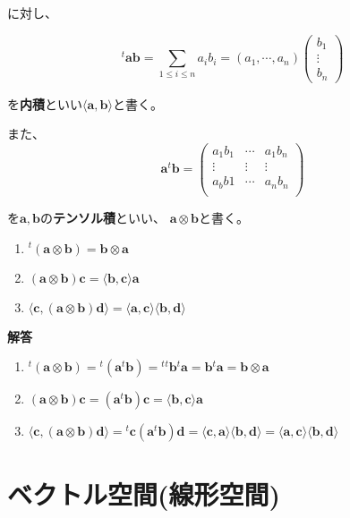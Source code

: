 \documentclass[dvipdfmx,autodetect-engine]{jsarticle}
\newcommand{\innerProduct}[2]{\langle \bm{#1}, \bm{#2} \rangle}
\newcommand{\tensorProduct}[2]{\bm{#1} \otimes \bm{#2}}
\begin{document}
に対し、


$$
{}^t\!\bm{a}\bm{b} = \sum_{1 \leq i \leq n} a_ib_i = (a_1, \cdots, a_n)\begin{pmatrix}
b_1 \\
\vdots \\
b_n
\end{pmatrix}
$$

を{\bf 内積}といい$\langle \bm{a}, \bm{b} \rangle$と書く。

また、
$$
\bm{a}{}^t\!\bm{b} = \begin{pmatrix}
a_1b_1 & \cdots & a_1b_n \\
\vdots & \vdots & \vdots \\
a_bb1 & \cdots & a_nb_n \\
\end{pmatrix}
$$

を$\bm{a}, \bm{b}$の{\bf テンソル積}といい、 $\bm{a} \otimes \bm{b}$と書く。


\begin{enumerate}
\renewcommand{\labelenumi}{(\arabic{enumi})}
\item ${}^t(\tensorProduct{a}{b}) = \tensorProduct{b}{a}$
\item $(\tensorProduct{a}{b})\bm{c} = \innerProduct{b}{c}\bm{a}$
\item $\innerProduct{c}{(\tensorProduct{a}{b})\bm{d}} = \innerProduct{a}{c}\innerProduct{b}{d}$
\end{enumerate}

{\bf 解答}

\begin{enumerate}
\renewcommand{\labelenumi}{(\arabic{enumi})}
\item ${}^t(\tensorProduct{a}{b}) = {}^t(\bm{a}{}^t\bm{b}) = {}^t{}^t\bm{b}{}^t\bm{a} = \bm{b}{}^t\bm{a} = \tensorProduct{b}{a}$
\item $(\tensorProduct{a}{b})\bm{c} = (\bm{a}{}^t\bm{b})\bm{c} = \innerProduct{b}{c}\bm{a}$
\item $\innerProduct{c}{(\tensorProduct{a}{b})\bm{d}} = {}^t\bm{c}(\bm{a}{}^t\bm{b})\bm{d} = \innerProduct{c}{a}\innerProduct{b}{d} = \innerProduct{a}{c}\innerProduct{b}{d}$
\end{enumerate}


\section{ベクトル空間(線形空間)}
\end{document}
